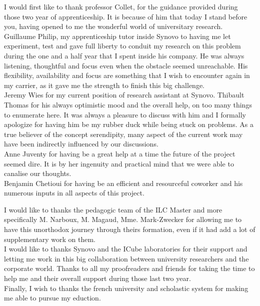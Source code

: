 \documentclass[12pt]{memoir}
\begin{document}
I would first like to thank professor Collet, for the guidance provided during those
two year of apprenticeship. It is because of him that today I stand before you,
having opened to me the wonderful world of universitary research. \\
Guillaume Philip, my apprenticeship tutor inside Synovo to having me let experiment, test
and gave full liberty to conduit my research on this problem during the one and a
half year that I spent inside his company. He was always listening, thoughtful and
focus even when the obstacle seemed unreachable. His flexibility, availability
and focus are something that I wish to encounter again in my carrier, as it gave me
the strength to finish this big challenge. \\
Jeremy Wies for my current position of research assistant at Synovo.
Thibault Thomas for his always optimistic mood and the overall help, on too many things to enumerate here. It was always a pleasure to discuss with him and I formally apologize for having him be my rubber duck while being stuck on problems. As a true believer of the concept serendipity, many aspect of the current work may have been indirectly influenced by our discussions. \\
Anne Juventy for having be a great help at a time the future of the project seemed
dire. It is by her ingenuity and practical mind that we were able to canalise our
thoughts.\\
Benjamin Chetioui for having be an efficient and resourceful coworker and his numerous inputs in all aspects of this project.


\bigskip
I would like to thanks the pedagogic team of the ILC Master and more specifically M. Narboux, M. Magaud, Mme. Mark-Zwecker for allowing me to have this unorthodox journey through theirs formation, even if it had add a lot of supplementary work on them. \\
I would like to thanks Synovo and the ICube laboratories for their support and
letting me work in this big collaboration between university researchers and the
corporate world.
Thanks to all my proofreaders and friends for taking the time to help me and their overall support during those last two year. \\
Finally, I wish to thanks the french university and scholastic system for making me able to pursue my eduction.  
\newpage
\end{document}
